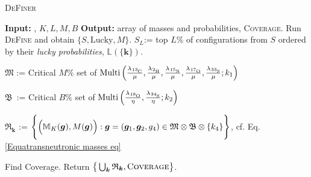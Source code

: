 \begin{algorithm}\caption{\textsc{DeFiner}}\label{DeFiner code}
\begin{algorithmic}
	\State	\textbf{Input:} \molecule, $K, L, M, B$
	\State 	\textbf{Output:} array of masses and probabilities, \textsc{Coverage}.
	\State 	Run \textsc{DeFine} and obtain $\{ S, \mathrm{Lucky}, M\}$.
	\State 	$S_L$:= top $L\%$ of configurations from $S$ ordered by their {\it lucky probabilities}, $\mathbb{L}(\{ \bm{k} \})$.
	

		\State $\mathfrak{M}$ := Critical $M\%$ set of $\mathrm{Multi} \left(
				\frac{ \lambda_\cem{^{13}C} }{ \mu }, 
				\frac{ \lambda_\cem{^{2} H} }{ \mu }, 
				\frac{ \lambda_\cem{^{15}N} }{ \mu },
				\frac{ \lambda_\cem{^{17}O} }{ \mu }, 
				\frac{ \lambda_\cem{^{33}S} }{ \mu }; 
				k_1
			\right )$

		\State $\mathfrak{B}$ \,:= Critical $B\%$ set of 
		$\mathrm{Multi} \left(
			\frac{ \lambda_\cem{^{18}O} }{ \eta },
			\frac{ \lambda_\cem{^{34}S} }{ \eta }; 
			k_2	
		\right)$		

		\State $\mathfrak{R}_{\bm{k}}$ := $ 
			\Bigg\{ 
				\Big( 
					\mathbb{M}_K( \bm{g} ), 
					M( \bm{g} )
				\Big) : \bm{g} = ( \bm{g}_1, \bm{g}_2, g_4 ) \in \mathfrak{M} \otimes \mathfrak{B} \otimes \{ k_4 \}  
			\Bigg\}$, cf. Eq. \eqref{Equatransneutronic masses eq} 
	\ENDFORALL

	\State 	Find {\sc Coverage}.
	\State 	Return $\big\{ \bigcup _{\bm{k}} \mathfrak{R}_{\bm{k}}, \textsc{Coverage} \big\}$.
\end{algorithmic}	
\end{algorithm}